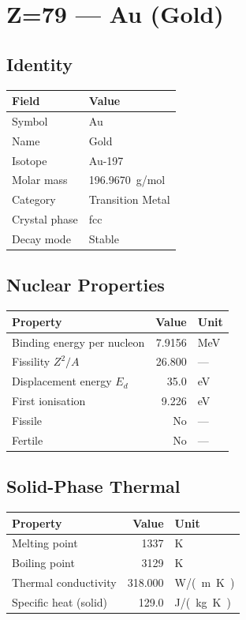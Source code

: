 \documentclass[11pt,a4paper]{article}
\begin{document}
\newpage

\section{Z=79 --- Au (Gold)}
\label{sec:Z79}

\subsection{Identity}
\begin{tabular}{ll}
  \toprule
  Field & Value \\
  \midrule
  Symbol & Au \\
  Name & Gold \\
  Isotope & Au-197 \\
  Molar mass & \SI{196.9670}{g/mol} \\
  Category & Transition Metal \\
  Crystal phase & fcc \\
  Decay mode & Stable \\
  \bottomrule
\end{tabular}

\subsection{Nuclear Properties}
\begin{tabular}{lrl}
  \toprule
  Property & Value & Unit \\
  \midrule
  Binding energy per nucleon & 7.9156 & \si{MeV} \\
  Fissility $Z^2/A$ & 26.800 & --- \\
  Displacement energy $E_d$ & 35.0 & \si{eV} \\
  First ionisation & 9.226 & \si{eV} \\
  Fissile & No & --- \\
  Fertile & No & --- \\
  \bottomrule
\end{tabular}

\subsection{Solid-Phase Thermal}
\begin{tabular}{lrl}
  \toprule
  Property & Value & Unit \\
  \midrule
  Melting point & 1337 & \si{K} \\
  Boiling point & 3129 & \si{K} \\
  Thermal conductivity & 318.000 & \si{W/(m.K)} \\
  Specific heat (solid) & 129.0 & \si{J/(kg.K)} \\
  \bottomrule
\end{tabular}
\end{document}

